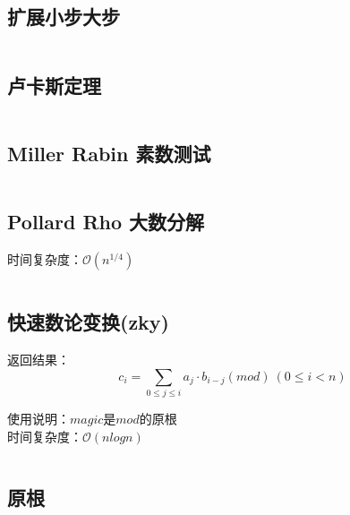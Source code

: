 \documentclass[landscape, oneside, a4paper, cs4size]{book}
\newcommand{\cppcode}[1]{
	\inputminted[mathescape,
	frame=lines,linenos]{cpp}{source/#1}
}
\begin{document}
\begin{multicols}{2}
\begin{spacing}{0.8}
\subsection{扩展小步大步}

\cppcode{number-theory/exBSGS.cpp}


\subsection{卢卡斯定理}

\cppcode{number-theory/Lucas.cpp}



\subsection{Miller Rabin 素数测试}


\cppcode{number-theory/miller-rabin.cpp}


\subsection{Pollard Rho 大数分解}


时间复杂度：$\mathcal{O}(n^{1/4})$


\cppcode{number-theory/pollard-rho.cpp}




\subsection{快速数论变换(zky)}

返回结果：$$c_i=\sum_{0 \leq j \leq i} a_j \cdot b_{i-j} (mod) \ (0 \leq i < n)$$

\indent 使用说明：$magic$是$mod$的原根\\

\indent 时间复杂度：$\mathcal{O}(n log n)$

\cppcode{number-theory/number-theoretic-transform.cpp}





\subsection{原根}

\cppcode{number-theory/primeroot.cpp}



\end{spacing}
\end{multicols}
\end{document}
